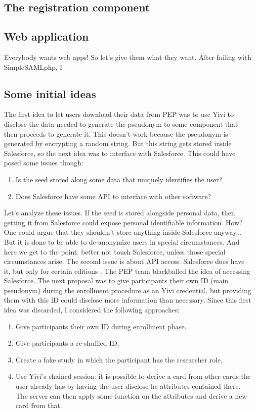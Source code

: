 \documentclass{report}
\begin{document}
\subsection{The registration component}


\iffalse

\subsection{Web application}
Everybody wants web apps! So let's give them what they want. After failing with SimpleSAMLphp, I 


\subsection{Some initial ideas}
The first idea to let users download their data from PEP was to use Yivi to disclose the data needed to generate the pseudonym to some component that then proceeds to generate it.
This doesn't work because the pseudonym is generated by encrypting a random string. But this string gets stored inside Salesforce, so the next idea was to interface with
Salesforce. This could have posed some issues though:
\begin{enumerate}
		\item Is the seed stored along some data that uniquely identifies the user?
		\item Does Salesforce have some API to interface with other software?
\end{enumerate}
Let's analyze these issues. If the seed is stored alongside personal data, then getting it from Salesforce could expose personal identifiable information. How? One could argue that
they shouldn't store anything inside Salesforce anyway... But it is done to be able to de-anonymize users in special circumstances. And here we get to the point: better not touch
Salesforce, unless those special circumstances arise. The second issue is about API access. Salesforce does have it, but only for certain editions \cite{salesforce}. The PEP team
blackballed the idea of accessing Salesforce. The next proposal was to give participants their own ID (main pseudonym) during the enrollment procedure as an Yivi credential, but
providing them with this ID could disclose more information than necessary.
Since this first idea was discarded, I considered the following approaches:
\begin{enumerate}
		\item Give participants their own ID during enrollment phase.
		\item Give participants a re-shuffled ID.
		\item Create a fake study in which the participant has the researcher role.
		\item Use Yivi’s chained session: it is possible to derive a card from other cards the user already has by having the user disclose he attributes contained there. The server can then apply some function on the attributes and derive a new card from that.
\end{enumerate}
\end{document}
